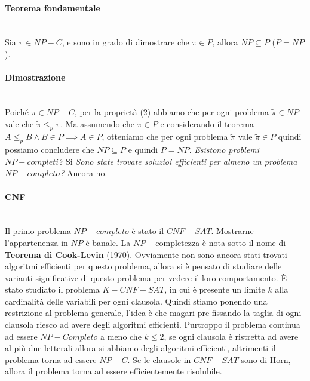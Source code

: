 \documentclass{article}
\begin{document}
\paragraph{Teorema fondamentale}\mbox{}\\
Sia $\pi\in NP-C$, e sono in grado di dimostrare che $\pi\in P$, allora $NP\subseteq P$ ($P=NP$).

\paragraph{Dimostrazione}\mbox{}\\
Poiché $\pi\in NP-C$, per la proprietà (2) abbiamo che per ogni problema $\tilde{\pi}\in NP$
vale che $\tilde{\pi}\leq_p\pi$. Ma assumendo che $\pi\in P$ e considerando il teorema
$A\leq_p B\land B\in P\implies A\in P$, otteniamo che per ogni problema $\tilde{\pi}$
vale $\tilde{\pi}\in P$ quindi possiamo concludere che $NP\subseteq P$ e quindi $P=NP$.
\textit{Esistono problemi $NP-completi$?} Si \textit{Sono state trovate soluzioi
    efficienti per almeno un problema $NP-completo$?} Ancora no.
\paragraph{CNF}\mbox{}\\
Il primo problema $NP-completo$ è stato il $CNF-SAT$. Mostrarne l'appartenenza in $NP$
è banale. La $NP-$completezza è nota sotto il nome di \textbf{Teorema di Cook-Levin} (1970).
Ovviamente non sono ancora stati trovati algoritmi efficienti per questo problema,
allora si è pensato di studiare delle varianti significative di questo problema
per vedere il loro comportamento.
\newline\newline
È stato studiato il problema $K-CNF-SAT$, in cui è presente un limite $k$ alla cardinalità
delle variabili per ogni clausola. Quindi stiamo ponendo una restrizione al problema
generale, l'idea è che magari pre-fissando la taglia di ogni clausola riesco ad avere
degli algoritmi efficienti. Purtroppo il problema continua ad essere $NP-Completo$ a meno
che $k\leq 2$, se ogni clausola è ristretta ad avere al più due letterali allora si abbiamo
degli algoritmi efficienti, altrimenti il problema torna ad essere $NP-C$.
\newline\newline
Se le clausole in $CNF-SAT$ sono di Horn, allora il problema torna ad essere efficientemente
risolubile.
\end{document}
